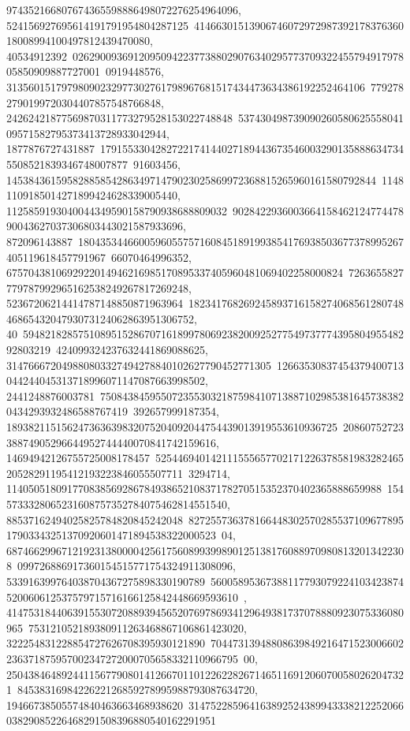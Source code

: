 {{{974352166807674365598886498072276254964096, 524156927695614191791954804287125\
4146630151390674607297298739217837636018008994100497812439470080, 40534912392\
02629009369120950942237738802907634029577370932245579491797805850909887727001\
0919448576, 31356015179798090232977302761798967681517434473634386192252464106\
7792782790199720304407857548766848, 24262421877569870311773279528153022748848\
53743049873909026058062555804109571582795373413728933042944, 1877876727431887\
17915533042827221741440271894436735460032901358886347345508521839346748007877\
91603456, 1453843615958288585428634971479023025869972368815265960161580792844\
11481109185014271899424628339005440, 1125859193040044349590158790938688809032\
902842293600366415846212477447890043627037306803443021587933696, 872096143887\
18043534466005960557571608451891993854176938503677378995267405119618457791967\
66070464996352, 6757043810692922014946216985170895337405960481069402258000824\
7263655827779787992965162538249267817269248, 52367206214414787148850871963964\
1823417682692458937161582740685612807484686543204793073124062863951306752, 40\
59482182857510895152867071618997806923820092527754973777439580495548292803219\
424099324237632441869088625, 314766672049880803327494278840102627790452771305\
12663530837454379400713044244045313718996071147087663998502, 2441248876003781\
75084384595507235530321875984107138871029853816457383820434293932486588767419\
392657999187354, 189382115156247363639832075204092044754439013919553610936725\
2086075272338874905296644952744440070841742159616, 14694942126755725008178457\
52544694014211155565770217122637858198328246520528291195412193223846055507711\
3294714, 11405051809177083856928678493865210837178270515352370402365888659988\
1545733328065231608757352784075462814551540, 88537162494025825784820845242048\
82725573637816644830257028553710967789517903343251370920601471894538322000523\
04, 6874662996712192313800004256175608993998901251381760889709808132013422308\
099726886917360154515771754324911308096, 533916399764038704367275898330190789\
56005895367388117793079224103423874520060612537579715716166125842448669593610\
, 414753184406391553072088939456520769786934129649381737078880923075336080965\
753121052189380911263468867106861423020, 322254831228854727626708395930121890\
70447313948808639849216471523006602236371875957002347272000705658332110966795\
00, 2504384648924411567790801412667011012262282671465116912060700580262047321\
8453831698422622126859278995988793087634720, 19466738505574840463663468938620\
31475228596416389252438994333821225206603829085226468291508396880540162291951\
}}}
